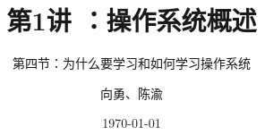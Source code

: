 


\title[第1讲]{第1讲 ：操作系统概述} %
\subtitle{第四节：为什么要学习和如何学习操作系统}
\author{向勇、陈渝} %
\date{\today} %



\begin{frame}
\titlepage %
\end{frame}

%
%

